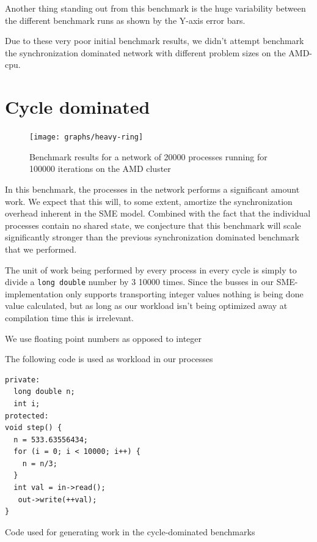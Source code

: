 Another thing standing out from this benchmark is the huge variability
between the different benchmark runs as shown by the Y-axis error bars.

Due to these very poor initial benchmark results, we didn't attempt
benchmark the synchronization dominated network with different problem
sizes on the AMD-cpu.


\section{Cycle dominated}

\begin{figure}
\centering
\texttt{[image: graphs/heavy-ring]}
\caption[Synchronization-dominated benchmark on AMD cluster]{Benchmark results for a network of 20000 processes running
for 100000 iterations on the AMD cluster}
\label{fig:heavy-ring}
\end{figure}


In this benchmark, the processes in the network performs a significant
amount work. We expect that this will, to some extent, amortize the
synchronization overhead inherent in the SME model. Combined with the
fact that the individual processes contain no shared state, we
conjecture that this benchmark will scale significantly stronger
than the previous synchronization dominated benchmark that we
performed.

The unit of work being performed by every process in every cycle is
simply to divide a \texttt{long double} number by 3 10000 times. Since
the busses in our SME-implementation only supports transporting
integer values nothing is being done value calculated, but as long as
our workload isn't being optimized away at compilation time this is
irrelevant.

We use floating point numbers as opposed to integer

The following code is used as workload in our processes
\begin{listing}[H]
\begin{verbatim}
private:
  long double n;
  int i;
protected:
void step() {
  n = 533.63556434;
  for (i = 0; i < 10000; i++) {
    n = n/3;
  }
  int val = in->read();
   out->write(++val);
}
\end{verbatim}
\caption{Code used for generating work in the cycle-dominated
  benchmarks}
\label{lst:cyclecode}
\end{listing}


